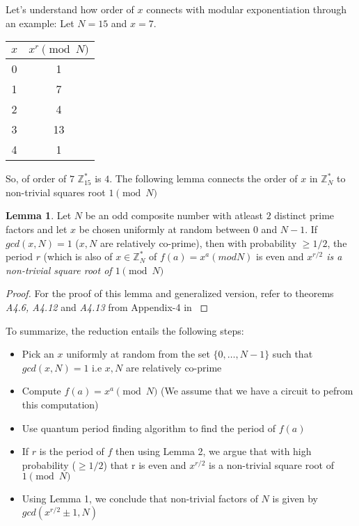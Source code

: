 \documentclass[11.5pt, paper=a4]{article}
\theoremstyle{definition}
\newtheorem{lemma}[theorem]{Lemma}
\numberwithin{theorem}{section}
\begin{document}
Let's understand how order of $x$ connects with modular exponentiation through an example: Let $N = 15$ and $x = 7$. 

\begin{center}
    \begin{tabular}{|c|c|}
    \hline
    $x$ & $x^r\pmod{N}$\\[0.5ex]
    \hline
    0 & 1 \\
    1 & 7 \\
    2 & 4 \\
    3 & 13 \\
    \hline\hline
    4 & 1 \\
    \hline
    \end{tabular}
\end{center}


So, of order of $7$ $\mathbb{Z}^*_{15}$ is $4$. The following lemma connects the order of $x$ in $\mathbb{Z}^*_N$ to non-trivial squares root  $1\pmod{N}$

\begin{lemma}
Let $N$ be an odd composite number with atleast $2$ distinct prime factors and let $x$ be chosen uniformly at random between  $0$ and $N-1$. If $gcd(x, N) =1$ ($x, N$ are relatively co-prime), then with probability $\ge 1/2$, the period $r$ (which is also of $x \in \mathbb{Z}^*_N$ of $f(a) = x^a (mod N)$ is even and \emph{$x^{r/2}$ is a non-trivial square root of $1\pmod{N}$}
\end{lemma} 
\begin{proof}
   For the proof of this lemma and generalized version, refer to theorems \emph{A4.6, A4.12} and \emph{A4.13} from Appendix-4 in \cite{nielsen2002quantum}
\end{proof}


To summarize, the reduction entails the following steps:
\begin{itemize}
    \item Pick an $x$ uniformly at random from the set $\{0, \dots, N-1\}$ such that $gcd(x, N) = 1$ i.e $x, N$ are relatively co-prime
    \item Compute $f(a) = x^a\pmod{N}$ (We assume that we have a circuit to pefrom this computation)
    \item Use quantum period finding algorithm to find the period of $f(a)$
    \item If $r$ is the period of $f$ then using Lemma 2, we argue that with high probability ($\ge 1/2$) that r is even and $x^{r/2}$ is a non-trivial square root of $1\pmod{N}$
    \item Using Lemma 1, we conclude that non-trivial factors of $N$ is given by $gcd(x^{r/2} \pm 1, N)$
\end{itemize}
\end{document}
